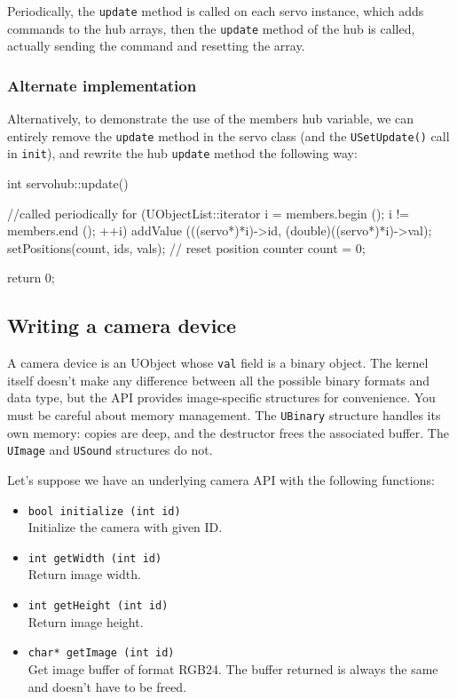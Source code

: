 Periodically, the \lstinline{update} method is called on each servo
instance, which adds commands to the hub arrays, then the
\lstinline{update} method of the hub is called, actually sending the
command and resetting the array.

\subsubsection{Alternate implementation}

Alternatively, to demonstrate the use of the members hub variable, we
can entirely remove the \lstinline{update} method in the servo class
(and the \lstinline{USetUpdate()} call in \lstinline{init}), and
rewrite the hub \lstinline{update} method the following way:

\begin{cxx}
int servohub::update()
{
  //called periodically
  for (UObjectList::iterator i = members.begin ();
       i != members.end ();
       ++i)
    addValue (((servo*)*i)->id, (double)((servo*)*i)->val);
  setPositions(count, ids, vals);
  // reset position counter
  count = 0;

  return 0;
}
\end{cxx}

\subsection{Writing a camera device}

A camera device is an UObject whose \lstinline{val} field is a binary
object. The \urbi kernel itself doesn't make any difference between
all the possible binary formats and data type, but the API provides
image-specific structures for convenience. You must be careful about
memory management. The \lstinline{UBinary} structure handles its own
memory: copies are deep, and the destructor frees the associated
buffer. The \lstinline{UImage} and \lstinline{USound} structures do
not.

Let's suppose we have an underlying camera API with the following functions:
\begin{itemize}
\item \lstinline{bool initialize (int id)}\\
  Initialize the camera with given ID.
\item \lstinline{int getWidth (int id)}\\
  Return image width.
\item \lstinline{int getHeight (int id)}\\
  Return image height.
\item \lstinline{char* getImage (int id)}\\
  Get image buffer of format RGB24.  The buffer returned is always the
  same and doesn't have to be freed.
\end{itemize}

